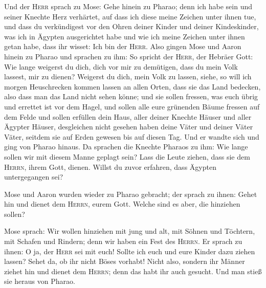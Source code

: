  Und der \textsc{Herr} sprach zu Mose: Gehe hinein zu
Pharao; denn ich habe sein und seiner Knechte Herz verhärtet, auf dass
ich diese meine Zeichen unter ihnen tue,  und dass du
verkündigest vor den Ohren deiner Kinder und deiner Kindeskinder, was
ich in Ägypten ausgerichtet habe und wie ich meine Zeichen unter ihnen
getan habe, dass ihr wisset: Ich bin der \textsc{Herr}. 
Also gingen Mose und Aaron hinein zu Pharao und sprachen zu ihm: So
spricht der \textsc{Herr}, der Hebräer Gott: Wie lange weigerst du dich,
dich vor mir zu demütigen, dass du mein Volk lassest, mir zu dienen?
 Weigerst du dich, mein Volk zu lassen, siehe, so will ich
morgen Heuschrecken kommen lassen an allen Orten,  dass
sie das Land bedecken, also dass man das Land nicht sehen könne; und sie
sollen fressen, was euch übrig und errettet ist vor dem Hagel, und
sollen alle eure grünenden Bäume fressen auf dem Felde 
und sollen erfüllen dein Haus, aller deiner Knechte Häuser und aller
Ägypter Häuser, desgleichen nicht gesehen haben deine Väter und deiner
Väter Väter, seitdem sie auf Erden gewesen bis auf diesen Tag. Und er
wandte sich und ging von Pharao hinaus.  Da sprachen die
Knechte Pharaos zu ihm: Wie lange sollen wir mit diesem Manne geplagt
sein? Lass die Leute ziehen, dass sie dem \textsc{Herrn}, ihrem Gott,
dienen. Willst du zuvor erfahren, dass Ägypten untergegangen sei?

 Mose und Aaron wurden wieder zu Pharao gebracht; der
sprach zu ihnen: Gehet hin und dienet dem \textsc{Herrn}, eurem Gott.
Welche sind es aber, die hinziehen sollen?

 Mose sprach: Wir wollen hinziehen mit jung und alt, mit
Söhnen und Töchtern, mit Schafen und Rindern; denn wir haben ein Fest
des \textsc{Herrn}.  Er sprach zu ihnen: O ja, der
\textsc{Herr} sei mit euch! Sollte ich euch und eure Kinder dazu ziehen
lassen? Sehet da, ob ihr nicht Böses vorhabt!  Nicht
also, sondern ihr Männer ziehet hin und dienet dem \textsc{Herrn}; denn
das habt ihr auch gesucht. Und man stieß sie heraus von Pharao.

